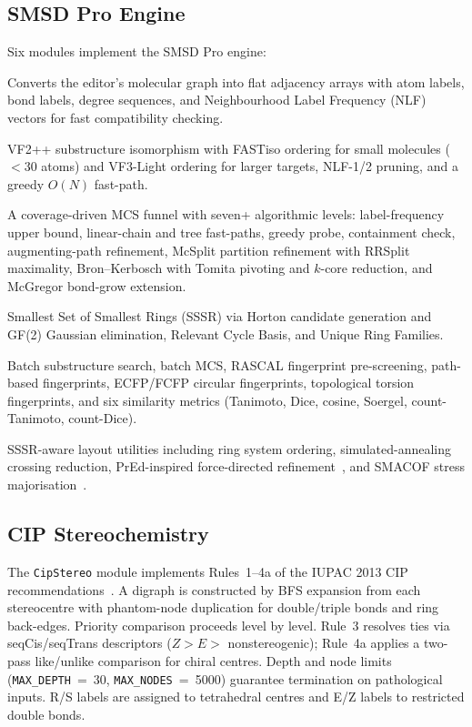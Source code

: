 \documentclass[twocolumn]{article}
\begin{document}
\subsection{SMSD Pro Engine}

Six modules implement the SMSD Pro engine:

\begin{description}[nosep,leftmargin=1em]
\item[\texttt{SmsdGraph}] Converts the editor's molecular graph into
  flat adjacency arrays with atom labels, bond labels, degree sequences,
  and Neighbourhood Label Frequency (NLF) vectors for fast
  compatibility checking.
\item[\texttt{SmsdVF2}] VF2++ substructure isomorphism with FASTiso
  ordering for small molecules ($<$30 atoms) and VF3-Light ordering for
  larger targets, NLF-1/2 pruning, and a greedy $O(N)$ fast-path.
\item[\texttt{SmsdMCS}] A coverage-driven MCS funnel with seven+
  algorithmic levels: label-frequency upper bound, linear-chain and tree
  fast-paths, greedy probe, containment check, augmenting-path
  refinement, McSplit partition refinement with RRSplit maximality,
  Bron--Kerbosch with Tomita pivoting and $k$-core reduction, and
  McGregor bond-grow extension.
\item[\texttt{SmsdRings}] Smallest Set of Smallest Rings (SSSR)
  via Horton candidate generation and GF(2) Gaussian elimination,
  Relevant Cycle Basis, and Unique Ring Families.
\item[\texttt{SmsdBatch}] Batch substructure search, batch MCS, RASCAL
  fingerprint pre-screening, path-based fingerprints, ECFP/FCFP
  circular fingerprints, topological torsion fingerprints, and six
  similarity metrics (Tanimoto, Dice, cosine, Soergel, count-Tanimoto,
  count-Dice).
\item[\texttt{SmsdLayout}] SSSR-aware layout utilities including ring
  system ordering, simulated-annealing crossing reduction, PrEd-inspired
  force-directed refinement~\citep{Bertault2000}, and SMACOF stress
  majorisation~\citep{deLeeuw1977}.
\end{description}

\subsection{CIP Stereochemistry}

The \texttt{CipStereo} module implements Rules~1--4a of the IUPAC 2013
CIP recommendations~\citep{Favre2013}.  A digraph is constructed by BFS
expansion from each stereocentre with phantom-node duplication for
double/triple bonds and ring back-edges.  Priority comparison proceeds
level by level.  Rule~3 resolves ties via seqCis/seqTrans descriptors
($Z > E > $ nonstereogenic); Rule~4a applies a two-pass
like/unlike comparison for chiral centres.  Depth and node limits
(\texttt{MAX\_DEPTH}~=~30, \texttt{MAX\_NODES}~=~5000) guarantee
termination on pathological inputs.  R/S labels are assigned to
tetrahedral centres and E/Z labels to restricted double bonds.
\end{document}

